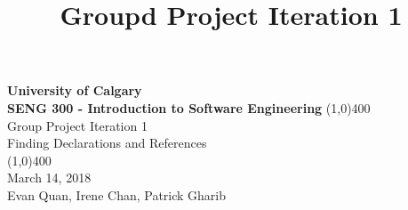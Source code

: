 \documentclass[12p]{article}
\title{\vspace{-6ex}Groupd Project Iteration 1}
\date{\vspace{-12ex}}
\begin{document}
\thispagestyle{fancy}

\begin{titlepage}
  \begin{center}
    \vspace{1cm}
    \Large{\textbf{University of Calgary}}\\
    \Large{\textbf{SENG 300  - Introduction to Software Engineering}}
    \vfill
    \line(1,0){400}\\[1mm]
    \huge{Group Project Iteration 1}\\
    \large{Finding Declarations and References}\\
    \line(1,0){400}\\
    \Large March 14, 2018\\
    \vfill
    \large{Evan Quan, Irene Chan, Patrick Gharib}\\
  \end{center}
\end{titlepage}

\tableofcontents
\thispagestyle{empty}
\clearpage

\onehalfspacing

\setcounter{page}{1}

\newpage
\end{document}
